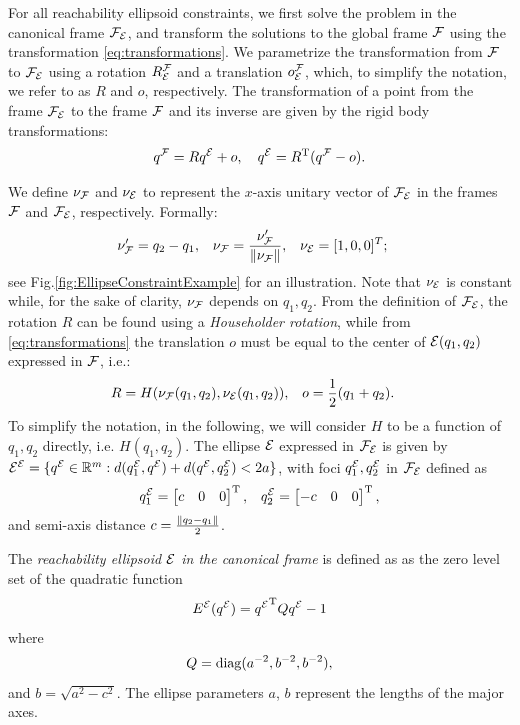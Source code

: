 \documentclass[10pt,twocolumn,twoside]{IEEEtran}
\begin{document}
For all reachability ellipsoid constraints, we first solve the problem in the canonical frame $\mathcal{F}_{\mathcal{E}}$, and transform the solutions to the global frame $\mathcal{F}$ using the transformation \eqref{eq:transformations}. We parametrize the transformation from $\mathcal{F}$ to $\mathcal{F}_{\mathcal{E}}$ using a rotation $R^{\mathcal{F}}_{\mathcal{E}}$ and a translation $o^{\mathcal{F}}_{\mathcal{E}}$, which, to simplify the notation, we refer to as $R$ and $o$, respectively. The transformation of a point from the frame $\mathcal{F}_{\mathcal{E}}$ to the frame $\mathcal{F}$ and its inverse are given by the rigid body transformations:
  \begin{equation}\label{eq:transformations}
    {q^{\mathcal{F}}}=R{q^{\mathcal{E}}}+o,\quad
    {q^{\mathcal{E}}}=R^\mathrm{T}({q^{\mathcal{F}}}-o).
  \end{equation}
 
  We define $\nu_{\mathcal{F}}$ and $\nu_{\mathcal{E}}$ to represent the $x$-axis unitary vector of $\mathcal{F}_{\mathcal{E}}$ in the frames $\mathcal{F}$ and $\mathcal{F}_{\mathcal{E}}$, respectively. Formally:
  \begin{align}
    \nu'_{\mathcal{F}}&=q_2-q_1, & \nu_{\mathcal{F}} &= \frac{\nu'_{\mathcal{F}}}{\lVert\nu_{\mathcal{F}}\rVert}, & \nu_{\mathcal{E}}&=[1,0,0]^T;
  \end{align}
  see Fig.\ref{fig:EllipseConstraintExample} for an illustration. Note that $\nu_{\mathcal{E}}$ is constant while, for the sake of clarity, $\nu_{\mathcal{F}}$ depends on $q_1,q_2$. From the definition of $\mathcal{F}_{\mathcal{E}}$, the rotation $R$ can be found using a \emph{Householder rotation}, while from \eqref{eq:transformations} the translation $o$ must be equal to the center of $\mathcal{E}(q_1,q_2)$ expressed in $\mathcal{F}$, i.e.:
  \begin{align} 
    R&=H(\nu_{\mathcal{F}}(q_1,q_2),\nu_{\mathcal{E}}(q_1,q_2)), &o&=\frac{1}{2}(q_1+q_2).
  \end{align}
  To simplify the notation, in the following, we will consider $H$ to be a function of $q_1,q_2$ directly, i.e. $H(q_1,q_2)$. 
  The ellipse $\mathcal{E}$ expressed in $\mathcal{F}_{\mathcal{E}}$ is given by ${\mathcal{E}^{\mathcal{E}}}=\{{q^{\mathcal{E}}}\in\mathbb{R}^{m}{}:d(q^{\mathcal{E}}_1,{q^{\mathcal{E}}})+d({q^{\mathcal{E}}},q^{\mathcal{E}}_2)<2a\}$, with foci $q^{\mathcal{E}}_1,q^{\mathcal{E}}_2$ in $\mathcal{F}_{\mathcal{E}}$ defined as
  \begin{align}
    q^{\mathcal{E}}_1=\begin{bmatrix}c & 0 & 0\end{bmatrix}^\mathrm{T}, && q^{\mathcal{E}}_2=\begin{bmatrix}-c & 0 & 0\end{bmatrix}^\mathrm{T},
  \end{align}
  and semi-axis distance $c=\frac{\lVert q_2-q_1\rVert}{2}$.
\begin{definition}
  The \emph{reachability ellipsoid $\mathcal{E}$ in the canonical frame} is defined as as the zero level set of the quadratic function
  \begin{equation}\label{equ:standard-ellipse}
    {E^{\mathcal{E}}}({q^{\mathcal{E}}}) = {q^{\mathcal{E}}}^\mathrm{T} Q {q^{\mathcal{E}}} - 1
  \end{equation}
  where
  \begin{equation}
    Q = \operatorname{diag}(a^{-2},b^{-2},b^{-2}),
  \end{equation}
  and $b = \sqrt{a^2-c^2}$.
  The ellipse parameters $a$, $b$ represent the lengths of the major axes.
\end{definition}
\end{document}
